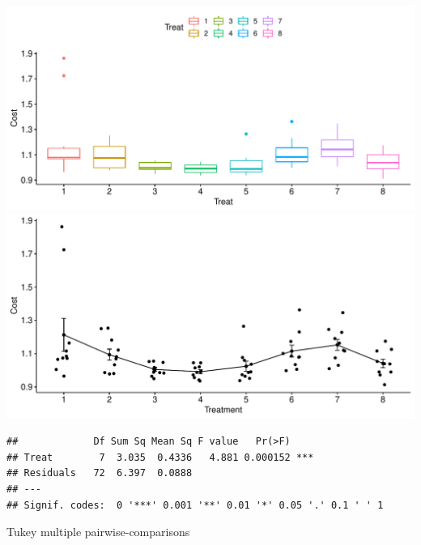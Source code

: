 \documentclass[
  11pt,
]{article}
\begin{document}
\includegraphics{def_files/figure-latex/unnamed-chunk-21-1.pdf}
\includegraphics{def_files/figure-latex/unnamed-chunk-21-2.pdf}

\begin{verbatim}
##             Df Sum Sq Mean Sq F value   Pr(>F)    
## Treat        7  3.035  0.4336   4.881 0.000152 ***
## Residuals   72  6.397  0.0888                     
## ---
## Signif. codes:  0 '***' 0.001 '**' 0.01 '*' 0.05 '.' 0.1 ' ' 1
\end{verbatim}

Tukey multiple pairwise-comparisons
\end{document}
